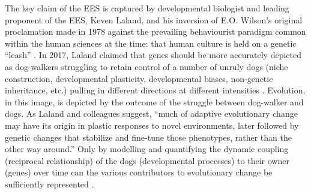 The key claim of the EES is captured by developmental biologist and leading proponent of the EES, Keven Laland, and his inversion of E.O. Wilson's original proclamation made in 1978 against the prevailing behaviourist paradigm common within the human sciences at the time: that human culture is held on a genetic ``leash'' \citep{Wilson1978}.  In 2017, Laland claimed that genes should be more accurately depicted as dog-walkers struggling to retain control of a number of unruly dogs (niche construction, developmental plasticity, developmental biases, non-genetic inheritance, etc.) pulling in different directions at different intensities \citep{West-Eberhard2003,Laland2017}.  Evolution, in this image, is depicted by the outcome of the struggle between dog-walker and dogs.  As Laland \citep[723][]{Laland2013} and colleagues suggest, ``much of adaptive evolutionary change may have its origin in plastic responses to novel environments, later followed by genetic changes that stabilize and fine-tune those phenotypes, rather than the other way around.'' Only by modelling and quantifying the dynamic coupling (reciprocal relationship) of the dogs (developmental processes) to their owner (genes) over time can the various contributors to evolutionary change be sufficiently represented \citep{Laland2013,Laland2015}.

